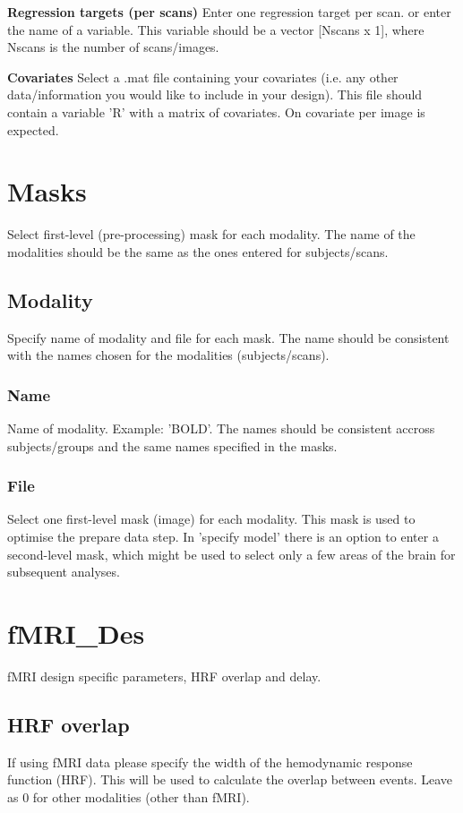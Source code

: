 \textbf{Regression targets (per scans)}
Enter one regression target per scan. or enter the name of a variable.  This variable should be a vector [Nscans x 1], where Nscans is the number of scans/images.


\textbf{Covariates}
Select a .mat file containing your covariates (i.e. any other data/information you would like to include in your design). This file should contain a variable 'R' with a matrix of covariates. On covariate per image is expected.


\section{Masks}
Select first-level (pre-processing) mask for each modality. The name of the modalities should be the same as the ones entered for subjects/scans.


\subsection{Modality}
Specify name of modality and file for each mask. The name should be consistent with the names chosen for the modalities (subjects/scans).


\subsubsection{Name}
Name of modality. Example: 'BOLD'. The names should be consistent accross subjects/groups and the same names specified in the masks.


\subsubsection{File}
Select one first-level mask (image) for each modality. This mask is used to optimise the prepare data step. In 'specify model' there is an option to enter a second-level mask, which might be used to select only a few areas of the brain for subsequent analyses.


\section{fMRI\_Des}
fMRI design specific parameters, HRF overlap and delay.


\subsection{HRF overlap}
If using fMRI data please specify the width of the hemodynamic response function (HRF). This will be used to calculate the overlap between events. Leave as 0 for other modalities (other than fMRI).


